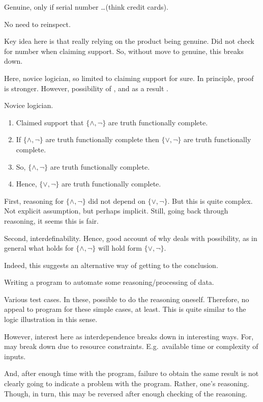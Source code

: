 \begin{note}
  \begin{illustration}
    \label{illu:number-check}
    Genuine, only if serial number \dots (think credit cards).
  \end{illustration}
  No need to reinspect.

  Key idea here is that really relying on the product being genuine.
  Did not check for number when claiming support.
  So, without move to genuine, this breaks down.
\end{note}

\begin{note}[Logician]
  Here, novice logician, so limited to claiming support for sure.
  In principle, proof is stronger.
  However, possibility of \mistaken{}, and as a result \misled{}.
  \begin{illustration}\label{illu:CS:tfc}
    Novice logician.
    \begin{enumerate}
    \item Claimed support that \(\{\land,\lnot\}\) are truth functionally complete.
    \item If \(\{\land,\lnot\}\) are truth functionally complete then \(\{\lor,\lnot\}\) are truth functionally complete.
    \item So, \(\{\land,\lnot\}\) are truth functionally complete.
    \item Hence, \(\{\lor,\lnot\}\) are truth functionally complete.
    \end{enumerate}
  \end{illustration}

  First, reasoning for \(\{\land,\lnot\}\) did not depend on \(\{\lor,\lnot\}\).
  But this is quite complex.
  Not explicit assumption, but perhaps implicit.
  Still, going back through reasoning, it seems this is fair.

  Second, interdefinability.
  Hence, good account of why deals with possibility, as in general what holds for \(\{\land,\lnot\}\) will hold form \(\{\lor,\lnot\}\).

  Indeed, this suggests an alternative way of getting to the conclusion.
\end{note}

\begin{note}[Programming]
  \begin{illustration}
    \label{illu:programming}
    Writing a program to automate some reasoning/processing of data.
  \end{illustration}
  Various test cases.
  In these, possible to do the reasoning oneself.
  Therefore, no appeal to program for these simple cases, at least.
  This is quite similar to the logic illustration in this sense.

  However, interest here as interdependence breaks down in interesting ways.
  For, may break down due to resource constraints.
  E.g.\ available time or complexity of inputs.

  And, after enough time with the program, failure to obtain the same result is not clearly going to indicate a problem with the program.
  Rather, one's reasoning.
  Though, in turn, this may be reversed after enough checking of the reasoning.
\end{note}

